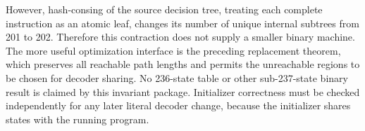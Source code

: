 However, hash-consing of the source decision tree, treating each complete
instruction as an atomic leaf, changes its number of unique internal subtrees
from 201 to 202.  Therefore this contraction does not
supply a smaller binary machine.  The more useful optimization interface is
the preceding replacement theorem, which preserves all reachable path lengths
and permits the unreachable regions to be chosen for decoder sharing.  No
236-state table or other sub-237-state binary result is claimed by this
invariant package.  Initializer correctness must be checked independently for
any later literal decoder change, because the initializer shares states with
the running program.
